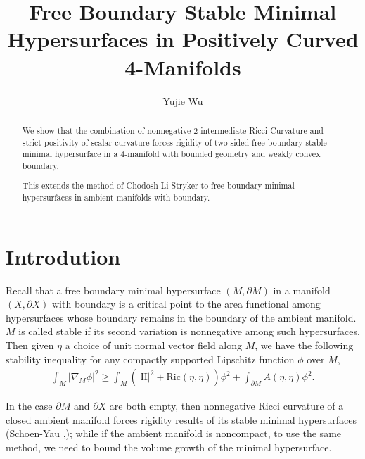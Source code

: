 \documentclass[12pt]{amsart}
\newcommand{\sff}{\mathrm{I\!I}}
\newcommand{\Ric}{\text{Ric}}
\newcommand{\p}{\partial}
\numberwithin{equation}{section}
\begin{document}
	


 \title[Stable Minimal Hypersurfaces in 4-Manifolds]{Free Boundary Stable Minimal Hypersurfaces in Positively Curved 4-Manifolds}



\author{Yujie Wu}







	\begin{abstract}
		We show that the combination of nonnegative 2-intermediate Ricci Curvature and strict positivity of scalar curvature forces rigidity of  two-sided free boundary stable minimal hypersurface in a 4-manifold with bounded geometry and weakly convex boundary.

		This extends the method of Chodosh-Li-Stryker to free boundary minimal hypersurfaces in ambient manifolds with boundary.
	\end{abstract}
	
	\maketitle

	\section{Introdution}
	Recall that a free boundary minimal hypersurface $(M,\p M)$ in a manifold $(X,\p X)$ with boundary is a critical point to the area functional among hypersurfaces whose boundary remains in the boundary of the ambient manifold. $M$ is called stable if its second variation is nonnegative among such hypersurfaces. Then given $\eta$ a choice of unit normal vector field along $M$, we have the following stability inequality for any compactly supported Lipschitz function $\phi$ over $M$,
	\begin{align*}
		\int_M |\nabla_M \phi|^2 \geq \int_M  (|\sff|^2+\Ric(\eta,\eta))\phi^2 +\int_{\partial M} A(\eta,\eta)\phi^2.
	\end{align*}
	


	In the case $\p M$ and $\p X$ are both empty, then nonnegative Ricci curvature of a closed ambient manifold forces rigidity results of its stable minimal hypersurfaces (Schoen-Yau \cite{SchoeYau1979-ExistenceIncompressibleMinimal},\cite{SchoeYau1979-StructureManifoldsPositive}); while if the ambient manifold is noncompact, to use the same method, we need to bound the volume growth of the minimal hypersurface. 
	
\end{document}
